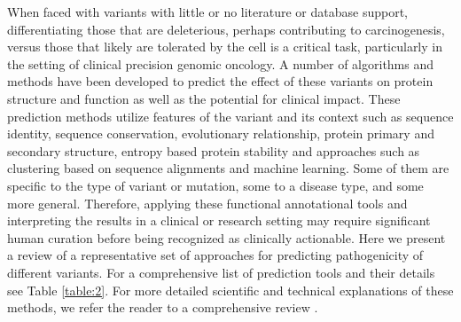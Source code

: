 \documentclass{article}
\begin{document}
When faced with variants with little or no literature or database
support, differentiating those that are deleterious, perhaps
contributing to carcinogenesis, versus those that likely are tolerated
by the cell is a critical task, particularly in the setting of
clinical precision genomic oncology.  A number of algorithms and
methods have been developed to predict the effect of these variants on
protein structure and function as well as the potential for clinical
impact. These prediction methods utilize features of the variant and
its context such as sequence identity, sequence conservation,
evolutionary relationship, protein primary and secondary structure,
entropy based protein stability and approaches such as clustering
based on sequence alignments and machine learning. Some of them are
specific to the type of variant or mutation, some to a disease type,
and some more general. Therefore, applying these functional
annotational tools and interpreting the results in a clinical or
research setting may require significant human curation before being
recognized as clinically actionable. Here we present a review of a
representative set of approaches for predicting pathogenicity of
different variants. For a comprehensive list of prediction tools and
their details see Table \ref{table:2}. For more detailed scientific and technical
explanations of these methods, we refer the reader to a comprehensive
review \cite{Addepalli2014-oa}.
\end{document}
